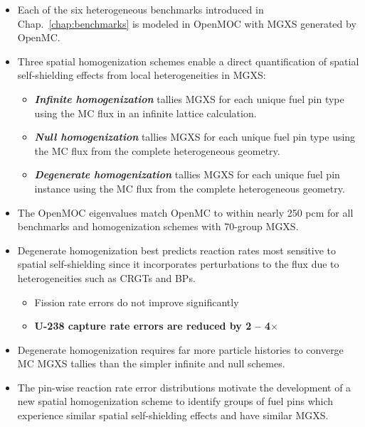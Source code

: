 \clearpage

\vfill
\begin{highlightsbox}[frametitle=Highlights]
\begin{itemize}
  \item Each of the six heterogeneous benchmarks introduced in Chap.~\ref{chap:benchmarks} is modeled in OpenMOC with \ac{MGXS} generated by OpenMC.
  \item Three spatial homogenization schemes enable a direct quantification of spatial self-shielding effects from local heterogeneities in \ac{MGXS}:
  \begin{itemize}
    \item \textbf{\textit{Infinite homogenization}} tallies \ac{MGXS} for each unique fuel pin type using the \ac{MC} flux in an infinite lattice calculation.
    \item \textbf{\textit{Null homogenization}} tallies \ac{MGXS} for each unique fuel pin type using the \ac{MC} flux from the complete heterogeneous geometry.
    \item \textbf{\textit{Degenerate homogenization}} tallies \ac{MGXS} for each unique fuel pin instance using the \ac{MC} flux from the complete heterogeneous geometry.
  \end{itemize}
  \item The OpenMOC eigenvalues match OpenMC to within nearly 250 \ac{pcm} for all benchmarks and homogenization schemes with 70-group \ac{MGXS}.
  \item Degenerate homogenization best predicts reaction rates most sensitive to spatial self-shielding since it incorporates perturbations to the flux due to heterogeneities such as \acp{CRGT} and \acp{BP}.
  \begin{itemize}
    \item Fission rate errors do not improve significantly
    \item \textbf{U-238 capture rate errors are reduced by 2 -- 4$\times$}
  \end{itemize}
  \item Degenerate homogenization requires far more particle histories to converge \ac{MC} \ac{MGXS} tallies than the simpler infinite and null schemes.
  \item The pin-wise reaction rate error distributions motivate the development of a new spatial homogenization scheme to identify groups of fuel pins which experience similar spatial self-shielding effects and have similar \ac{MGXS}.
\end{itemize}
\end{highlightsbox}
\vfill